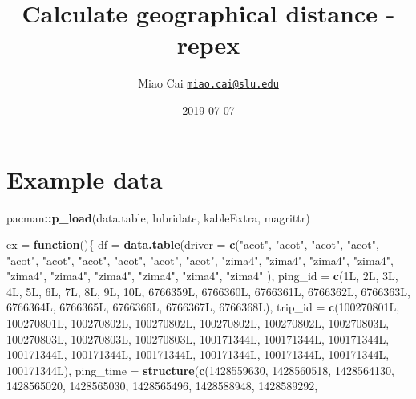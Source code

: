 \documentclass[]{article}
\title{Calculate geographical distance - repex}
\author{Miao Cai \href{mailto:miao.cai@slu.edu}{\nolinkurl{miao.cai@slu.edu}}}
\date{2019-07-07}
\newenvironment{Shaded}{\begin{snugshade}}{\end{snugshade}}
\newcommand{\ControlFlowTok}[1]{\textcolor[rgb]{0.13,0.29,0.53}{\textbf{#1}}}
\newcommand{\DataTypeTok}[1]{\textcolor[rgb]{0.13,0.29,0.53}{#1}}
\newcommand{\DecValTok}[1]{\textcolor[rgb]{0.00,0.00,0.81}{#1}}
\newcommand{\KeywordTok}[1]{\textcolor[rgb]{0.13,0.29,0.53}{\textbf{#1}}}
\newcommand{\NormalTok}[1]{#1}
\newcommand{\OperatorTok}[1]{\textcolor[rgb]{0.81,0.36,0.00}{\textbf{#1}}}
\newcommand{\StringTok}[1]{\textcolor[rgb]{0.31,0.60,0.02}{#1}}
\begin{document}
\maketitle

{
\setcounter{tocdepth}{2}
\tableofcontents
}
\hypertarget{example-data}{%
\section*{Example data}\label{example-data}}

\begin{Shaded}
\begin{Highlighting}[]
\NormalTok{pacman}\OperatorTok{::}\KeywordTok{p_load}\NormalTok{(data.table, lubridate, kableExtra, magrittr)}

\NormalTok{ex =}\StringTok{ }\ControlFlowTok{function}\NormalTok{()\{}
\NormalTok{  df =}\StringTok{ }\KeywordTok{data.table}\NormalTok{(}\DataTypeTok{driver =} \KeywordTok{c}\NormalTok{(}\StringTok{"acot"}\NormalTok{, }\StringTok{"acot"}\NormalTok{, }\StringTok{"acot"}\NormalTok{, }\StringTok{"acot"}\NormalTok{, }\StringTok{"acot"}\NormalTok{, }
\StringTok{"acot"}\NormalTok{, }\StringTok{"acot"}\NormalTok{, }\StringTok{"acot"}\NormalTok{, }\StringTok{"acot"}\NormalTok{, }\StringTok{"acot"}\NormalTok{, }\StringTok{"zima4"}\NormalTok{, }\StringTok{"zima4"}\NormalTok{, }\StringTok{"zima4"}\NormalTok{, }
\StringTok{"zima4"}\NormalTok{, }\StringTok{"zima4"}\NormalTok{, }\StringTok{"zima4"}\NormalTok{, }\StringTok{"zima4"}\NormalTok{, }\StringTok{"zima4"}\NormalTok{, }\StringTok{"zima4"}\NormalTok{, }\StringTok{"zima4"}
\NormalTok{), }\DataTypeTok{ping_id =} \KeywordTok{c}\NormalTok{(1L, 2L, 3L, 4L, 5L, 6L, 7L, 8L, 9L, 10L, 6766359L, }
\NormalTok{6766360L, 6766361L, 6766362L, 6766363L, 6766364L, 6766365L, 6766366L, }
\NormalTok{6766367L, 6766368L), }\DataTypeTok{trip_id =} \KeywordTok{c}\NormalTok{(100270801L, 100270801L, 100270802L, }
\NormalTok{100270802L, 100270802L, 100270802L, 100270803L, 100270803L, 100270803L, }
\NormalTok{100270803L, 100171344L, 100171344L, 100171344L, 100171344L, 100171344L, }
\NormalTok{100171344L, 100171344L, 100171344L, 100171344L, 100171344L), }
    \DataTypeTok{ping_time =} \KeywordTok{structure}\NormalTok{(}\KeywordTok{c}\NormalTok{(}\DecValTok{1428559630}\NormalTok{, }\DecValTok{1428560518}\NormalTok{, }\DecValTok{1428564130}\NormalTok{, }
    \DecValTok{1428565020}\NormalTok{, }\DecValTok{1428565030}\NormalTok{, }\DecValTok{1428565496}\NormalTok{, }\DecValTok{1428588948}\NormalTok{, }\DecValTok{1428589292}\NormalTok{, }

\end{Highlighting}
\end{Shaded}
\end{document}
